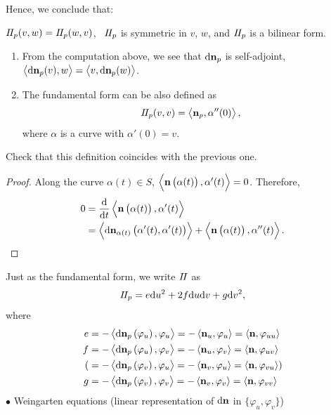 Hence, we conclude that: 
\begin{theorem}
    \(I\!I_p(v,w)=I\!I_p(w,v)\), \ie\ 
    \(I\!I_p\) is symmetric in \(v\), \(w\), and
    \(I\!I_p\) is a bilinear form. 
\end{theorem}
\begin{remark}
    \hfill
    \begin{enumerate}[(1)]
        \item From the computation above, we see that 
        \(\dd\vb{n}_p\) is self-adjoint, \ie\ 
        \(\left\langle \dd\vb{n}_p(v),w\right\rangle=
        \left\langle v, \dd\vb{n}_p(w)\right\rangle
        \).
        \item The  fundamental form can be also 
        defined as 
        \[I\!I_p(v,v)=\left\langle\vb{n}_p,\alpha''(0)\right\rangle,\]
        where \(\alpha\) is a curve with \(\alpha'(0)=v\).
    \end{enumerate}
\end{remark}
\begin{exercise}
    Check that this definition coincides with the previous one.
\end{exercise}
\begin{proof}
    Along the curve \(\alpha(t)\in S\), \(\left\langle
    \vb{n}\left(\alpha(t)\right),\alpha'(t)\right\rangle=0\).
    Therefore, 
    \begin{align*}
        0&=\dv{t}\left\langle\vb{n}\left(\alpha(t)\right),\alpha'(t)
        \right\rangle\\
        &= \left\langle \dd\vb{n}_{\alpha(t)}\left(\alpha'(t)
        ,\alpha'(t)\right)\right\rangle+\left\langle
         \vb{n}\left(\alpha(t)\right),\alpha''(t)\right\rangle.
    \end{align*}
\end{proof}
Just as the  fundamental form, we write \(I\!I\) as 
\[
    I\!I_p=e\dd u^2+2f\dd u\dd v+g\dd v^2,
\]
where 
\begin{align*}
    e&=-\left\langle \dd\vb{n}_p\left(\varphi_u\right),\varphi_u\right\rangle
    =-\left\langle\vb{n}_u,\varphi_u\right\rangle=\left\langle
        \vb{n},\varphi_{uu}\right\rangle\\
    f&=-\left\langle \dd\vb{n}_p\left(\varphi_u\right),\varphi_v\right\rangle
    =-\left\langle\vb{n}_u,\varphi_v\right\rangle=\left\langle
        \vb{n},\varphi_{uv}\right\rangle\\
        (&=-\left\langle \dd\vb{n}_p\left(\varphi_v\right),\varphi_u
        \right\rangle=-\left\langle\vb{n}_v,\varphi_u\right\rangle
        =\left\langle\vb{n},\varphi_{vu}\right\rangle)\\
        g&=-\left\langle \dd\vb{n}_p\left(\varphi_v\right),\varphi_v
        \right\rangle=-\left\langle\vb{n}_v,\varphi_v
        \right\rangle=\left\langle\vb{n},\varphi_{vv}\right\rangle
\end{align*}
\(\bullet\) Weingarten equations (linear representation of \(\dd\vb{n}\)
in \(\{\varphi_u,\varphi_v\}\))

